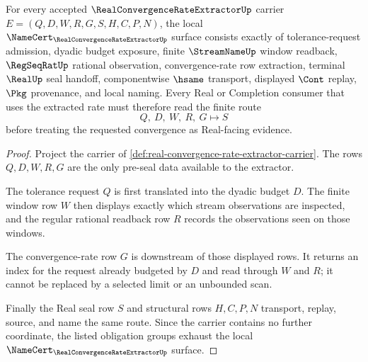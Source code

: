 \begin{theorem}
\label{thm:real-convergence-rate-extractor-namecert-obligations}
For every accepted $\RealConvergenceRateExtractorUp$ carrier $E=(Q,D,W,R,G,S,H,C,P,N)$, the local $\NameCert_{\RealConvergenceRateExtractorUp}$ surface consists exactly of tolerance-request admission, dyadic budget exposure, finite $\StreamNameUp$ window readback, $\RegSeqRatUp$ rational observation, convergence-rate row extraction, terminal $\RealUp$ seal handoff, componentwise $\hsame$ transport, displayed $\Cont$ replay, $\Pkg$ provenance, and local naming. Every Real or Completion consumer that uses the extracted rate must therefore read the finite route
$$
Q,\ D,\ W,\ R,\ G \longmapsto S
$$
before treating the requested convergence as Real-facing evidence.
\end{theorem}
\begin{proof}
Project the carrier of \autoref{def:real-convergence-rate-extractor-carrier}. The rows $Q,D,W,R,G$ are the only pre-seal data available to the extractor.

The tolerance request $Q$ is first translated into the dyadic budget $D$. The finite window row $W$ then displays exactly which stream observations are inspected, and the regular rational readback row $R$ records the observations seen on those windows.

The convergence-rate row $G$ is downstream of those displayed rows. It returns an index for the request already budgeted by $D$ and read through $W$ and $R$; it cannot be replaced by a selected limit or an unbounded scan.

Finally the Real seal row $S$ and structural rows $H,C,P,N$ transport, replay, source, and name the same route. Since the carrier contains no further coordinate, the listed obligation groups exhaust the local $\NameCert_{\RealConvergenceRateExtractorUp}$ surface.
\end{proof}

